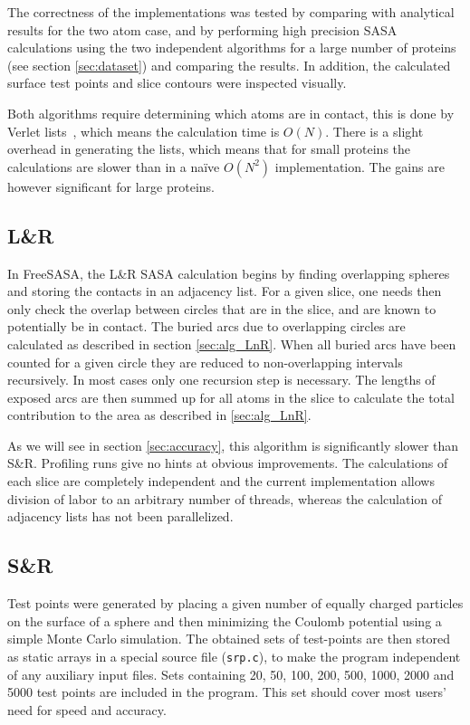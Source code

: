 \documentclass[a4paper,11pt]{article}
\begin{document}
\begin{small}
The correctness of the implementations was tested by comparing with
analytical results for the two atom case, and by performing high
precision SASA calculations using the two independent algorithms for a
large number of proteins (see section \ref{sec:dataset}) and comparing
the results. In addition, the calculated surface test
points and slice contours were inspected visually.

Both algorithms require determining which atoms are in contact, this
is done by Verlet lists~\cite{Verlet}, which means the calculation
time is $O(N)$. There is a slight overhead in generating the lists,
which means that for small proteins the calculations are slower than
in a na\"{i}ve $O(N^2)$ implementation. The gains are however
significant for large proteins.

\subsection{L\&R}

In FreeSASA, the L\&R SASA calculation begins by finding overlapping
spheres and storing the contacts in an adjacency list. For a given
slice, one needs then only check the overlap between circles that are
in the slice, and are known to potentially be in contact. The buried
arcs due to overlapping circles are calculated as described in section
\ref{sec:alg_LnR}. When all buried arcs have been counted for a given
circle they are reduced to non-overlapping intervals recursively. In
most cases only one recursion step is necessary. The lengths of
exposed arcs are then summed up for all atoms in the slice to
calculate the total contribution to the area as described in
\ref{sec:alg_LnR}.

As we will see in section \ref{sec:accuracy}, this algorithm is
significantly slower than S\&R. Profiling runs give no hints at
obvious improvements. The calculations of each slice are completely
independent and the current implementation allows division of labor to
an arbitrary number of threads, whereas the calculation of adjacency
lists has not been parallelized.

\subsection{S\&R}

Test points were generated by placing a given number of equally
charged particles on the surface of a sphere and then minimizing the
Coulomb potential using a simple Monte Carlo simulation. The obtained
sets of test-points are then stored as static arrays in a special
source file (\texttt{srp.c}), to make the program independent of any
auxiliary input files. Sets containing 20, 50, 100, 200, 500, 1000,
2000 and 5000 test points are included in the program. This set should
cover most users' need for speed and accuracy.


\end{small}
\end{document}
